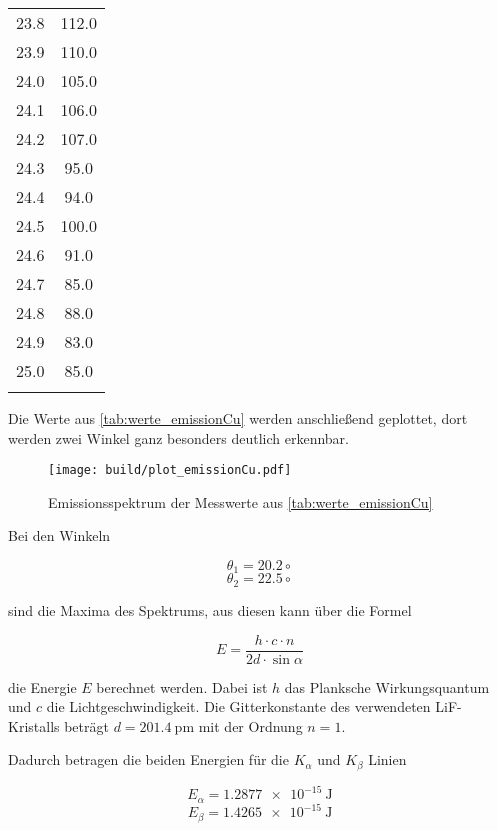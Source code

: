 \begin{table}
\begin{tabular}{S[table-format=1.1] S[table-format=4.1]}
    23.8&	112.0\\
    23.9&	110.0\\
    24.0&	105.0\\
    24.1&	106.0\\
    24.2&	107.0\\
    24.3&	95.0\\
    24.4&	94.0\\
    24.5&	100.0\\
    24.6&	91.0\\
    24.7&	85.0\\
    24.8&	88.0\\
    24.9&	83.0\\
    25.0&	85.0\\
    &\\
        \bottomrule
    \end{tabular}
\end{table}

Die Werte aus \autoref{tab:werte_emissionCu} werden anschließend geplottet, dort werden zwei Winkel ganz besonders deutlich erkennbar.

\begin{figure}
    \centering
    \texttt{[image: build/plot\_emissionCu.pdf]}
    \caption{Emissionsspektrum der Messwerte aus \autoref{tab:werte_emissionCu}}
    \label{fig:emissionCu_plot}
\end{figure}

Bei den Winkeln 

\begin{equation}
    \theta _1 = 20.2 \circ
\end{equation}
\begin{equation}
    \theta _2 = 22.5 \circ
\end{equation}

sind die Maxima des Spektrums, aus diesen kann über die Formel 

\begin{equation}
    E = \frac{h \cdot c \cdot n}{2d \cdot \sin{\alpha}}
\end{equation}

die Energie $E$ berechnet werden.
Dabei ist $h$ das Planksche Wirkungsquantum und $c$ die Lichtgeschwindigkeit. \cite{physics_constants}
Die Gitterkonstante des verwendeten LiF-Kristalls beträgt $d = \SI{201.4}{\pico\meter}$ mit der Ordnung $n = 1$.

Dadurch betragen die beiden Energien für die $K_\alpha$ und $K_\beta$ Linien

\begin{equation}
    E_\alpha = \SI{1.2877e-15}{\joule}
\end{equation}
\begin{equation}
    E_\beta = \SI{1.4265e-15}{\joule}
\end{equation}

